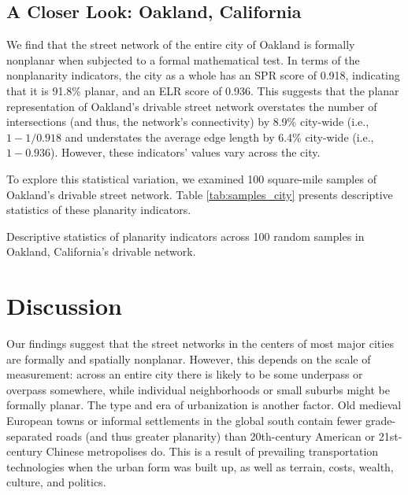 \documentclass[Afour,sageh,times]{sagej}
\begin{document}
\subsection{A Closer Look: Oakland, California}

We find that the street network of the entire city of Oakland is formally nonplanar when subjected to a formal mathematical test. In terms of the nonplanarity indicators, the city as a whole has an SPR score of 0.918, indicating that it is 91.8\% planar, and an ELR score of 0.936. This suggests that the planar representation of Oakland's drivable street network overstates the number of intersections (and thus, the network's connectivity) by 8.9\% city-wide (i.e., $1 - 1 / 0.918$ and understates the average edge length by 6.4\% city-wide (i.e., $1 - 0.936$). However, these indicators' values vary across the city.

To explore this statistical variation, we examined 100 square-mile samples of Oakland's drivable street network. Table \ref{tab:samples_city} presents descriptive statistics of these planarity indicators. 



\begin{table}[htbp]
\centering
\caption{Descriptive statistics of planarity indicators across 100 random samples in Oakland, California's drivable network.}
\label{tab:samples_city}

\end{table}






\section{Discussion}

Our findings suggest that the street networks in the centers of most major cities are formally and spatially nonplanar. However, this depends on the scale of measurement: across an entire city there is likely to be some underpass or overpass somewhere, while individual neighborhoods or small suburbs might be formally planar. The type and era of urbanization is another factor. Old medieval European towns or informal settlements in the global south contain fewer grade-separated roads (and thus greater planarity) than 20th-century American or 21st-century Chinese metropolises do. This is a result of prevailing transportation technologies when the urban form was built up, as well as terrain, costs, wealth, culture, and politics.
\end{document}
